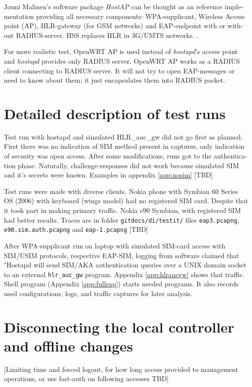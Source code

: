 \documentclass[12pt,a4paper,english]{tutthesis}
\begin{document}
\begin{otherlanguage}{english}
Jouni Malinen's software package \emph{HostAP} can be thought as an reference
implementation providing all necessary components: WPA-supplicant, Wireless
Access point (AP), HLR-gateway (for GSM networks) and EAP-endpoint with
or without RADIUS-server. HSS replaces HLR in 3G/UMTS networks.
\cite{hostapd}.

For more realistic test, OpenWRT AP is used instead of \emph{hostapd}'s
access point and \emph{hostapd} provides only RADIUS server.
OpenWRT AP works as a RADIUS client connecting to RADIUS server. 
It will not try to open EAP-messages or need
to know about them; it just encapsulates them into RADIUS packet.

\section{Detailed description of test runs}
\label{sec-5-2}



Test run with hostapd and simulated HLR\_auc\_gw
did not go first as planned. First there was no indication of SIM method
present in captures, only indication of security was open access.
After some modifications, runs got to the authentication phase.
Naturally, challenge-responses did not work 
because simulated SIM and it's secrets were known. 
Examples in appendix \ref{app:nosim}   [TBD]



Test runs were made with diverse clients.
Nokia phone with Symbian 60 Series OS (2006) with keyboard
(wings model) had no registered SIM card. Despite that it took part in making
primary traffic.
Nokia e90 Symbian, with registered SIM had better results. Traces
are in folder \verb~gitdocs/di/testit/~ files \verb~eap3.pcapng~,
  \verb~e90.sim.auth.pcapng~ and \verb~eap-1.pcapng~  [TBD]

After WPA-supplicant run on laptop with simulated SIM-card access 
with SIM/USIM protocols, respective EAP-SIM, logging 
from software claimed that "Hostapd will send SIM/AKA authentication
queries over a UNIX domain socket to an external \verb~hlr_auc_gw~ program.
Appendix \ref{app:hlraucgw}   shows that traffic.
Shell program (Appendix \ref{app:fulleap}) starts needed programs. It also records used
configurations, logs, and traffic captures for later analysis.

\section{Disconnecting the local controller and offline changes}
\label{sec-5-3}
[Limiting time and forced logout, for how long access provided to
management operations, or use fast-auth on following accesses TBD]


\end{otherlanguage}
\end{document}
